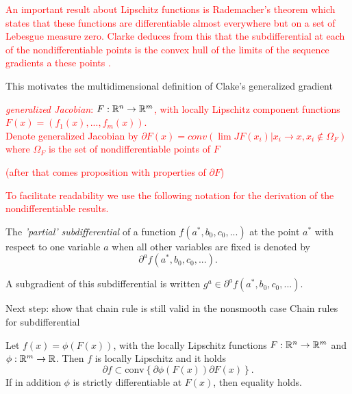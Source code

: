 \textcolor{red}{An important result about Lipschitz functions is Rademacher's theorem which states that these functions are differentiable almost everywhere but on a set of Lebesgue measure zero\cite[Theorem 3.1]{Heinonen2004}. 
Clarke deduces from this that the subdifferential at each of the nondifferentiable points is the convex hull of the limits of the sequence gradients a these points \cite[see Theorem 2.5.1]{Clarke1990}.}

This motivates the multidimensional definition of Clake's generalized gradient 

\textcolor{red}{
\begin{definition}
	\emph{generalized Jacobian}: \(F:\mathbb{R}^n \to \mathbb{R}^m\), with locally Lipschitz component functions \(F(x) = (f_1(x),...,f_m(x))\).\\
	Denote generalized Jacobian by \(\partial F(x) = conv\left(\lim JF(x_i)|x_i\to x, x_i \notin \Omega_F \right) \) where \(\Omega_F\) is the set of nondifferentiable points of \(F\)
\end{definition}
(after that comes proposition with properties of \(\partial F\))}


\textcolor{red}{To facilitate readability we use the following notation for the derivation of the nondifferentiable results.}

The \emph{'partial' subdifferential} of a function \(f(a^*,b_0,c_0,...)\) at the point \(a^*\) with respect to one variable \(a\) when all other variables are fixed is denoted by 
\begin{equation*}
	\partial^{a} f(a^*,b_0,c_0,...).
\end{equation*}

A subgradient of this subdifferential is written \(g^{a} \in \partial^{a} f(a^*,b_0,c_0,...)\).

Next step: show that chain rule is still valid in the nonsmooth case
Chain rules for subdifferential \\

\begin{theorem}
	Let \(f(x)=\phi(F(x))\), with the locally Lipschitz functions \(F: \mathbb{R}^n \to \mathbb{R}^m\) and \(\phi:\mathbb{R}^m \to \mathbb{R}\). Then \(f\) is locally Lipschitz and it holds
	\begin{equation*}
		\partial f \subset \text{conv}\left\{\partial \phi(F(x))\partial F(x)\right\}.
	\end{equation*}
	If in addition \(\phi\) is strictly differentiable at \(F(x)\), then equality holds.
\end{theorem}

